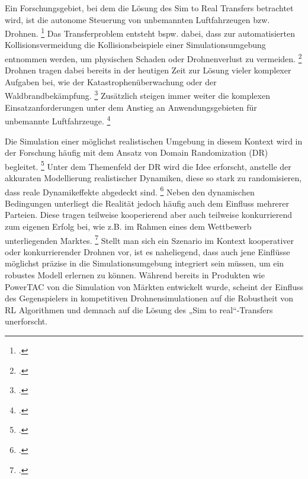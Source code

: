 Ein Forschungsgebiet, bei dem die Lösung des Sim to Real Transfers betrachtet wird, ist die autonome Steuerung von unbemannten Luftfahrzeugen bzw. Drohnen. \footcite[Vgl.][S. 1]{Deshpande.2021}
Das Transferproblem entsteht bspw. dabei, dass zur automatisierten Kollisionsvermeidung die Kollisionsbeispiele einer Simulationsumgebung entnommen werden, um physischen Schaden oder Drohnenverlust zu vermeiden. \footcite[Vgl.][S. 4]{Sadeghi.2016}
Drohnen tragen dabei bereits in der heutigen Zeit zur Lösung vieler komplexer Aufgaben bei, wie der Katastrophenüberwachung oder der Waldbrandbekämpfung. \footcite[Vgl.][S. 1495]{Hentati.2018}
Zusätzlich steigen immer weiter die komplexen Einsatzanforderungen unter dem Anstieg an Anwendungsgebieten für unbemannte Luftfahrzeuge. \footcite[Vgl.][S. 1]{Deshpande.2020}

Die Simulation einer möglichst realistischen Umgebung in diesem Kontext wird in der Forschung häufig mit dem Ansatz von Domain Randomization (DR) begleitet. \footcite[Vgl.][S. 1]{Sadeghi.2016}
Unter dem Themenfeld der DR wird die Idee erforscht, anstelle der akkuraten Modellierung realistischer Dynamiken, diese so stark zu randomisieren, dass reale Dynamikeffekte abgedeckt sind. \footcite[Vgl.][S. 4f.]{Zhao.2020}
Neben den dynamischen Bedingungen unterliegt die Realität jedoch häufig auch dem Einfluss mehrerer Parteien.
Diese tragen teilweise kooperierend aber auch teilweise konkurrierend zum eigenen Erfolg bei, wie z.B. im Rahmen eines dem Wettbewerb unterliegenden Marktes. \footcite[Vgl.][S. 2]{COLLINS2022101217}
Stellt man sich ein Szenario im Kontext kooperativer oder konkurrierender Drohnen vor, ist es naheliegend, dass auch jene Einflüsse möglichst präzise in die Simulationsumgebung integriert sein müssen, um ein robustes Modell erlernen zu können.
Während bereits in Produkten wie PowerTAC von \cite[][]{COLLINS2022101217} die Simulation von Märkten entwickelt wurde, scheint der Einfluss des Gegenspielers in kompetitiven Drohnensimulationen auf die Robustheit von RL Algorithmen und demnach auf die Lösung des „Sim to real“-Transfers unerforscht.